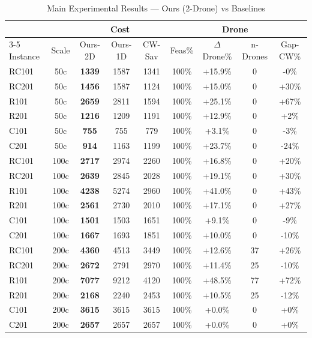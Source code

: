 \begin{table}[htbp]
\centering
\caption{Main Experimental Results — Ours (2-Drone) vs Baselines}
\label{tab:main_results}
\small
\begin{tabular}{lcccccccc}
\toprule
&& \multicolumn{3}{c}{Cost} && \multicolumn{2}{c}{Drone} & \\
\cmidrule{3-5} \cmidrule{7-8}
Instance & Scale & Ours-2D & Ours-1D & CW-Sav & Feas\% & $\Delta$Drone\% & n-Drones & Gap-CW\% \\
\midrule
  RC101 & 50c & \textbf{1339} & 1587 & 1341 & 100\% & +15.9\% & 0 & -0\% \\
  RC201 & 50c & \textbf{1456} & 1587 & 1124 & 100\% & +15.0\% & 0 & +30\% \\
  R101 & 50c & \textbf{2659} & 2811 & 1594 & 100\% & +25.1\% & 0 & +67\% \\
  R201 & 50c & \textbf{1216} & 1209 & 1191 & 100\% & +12.9\% & 0 & +2\% \\
  C101 & 50c & \textbf{755} & 755 & 779 & 100\% & +3.1\% & 0 & -3\% \\
  C201 & 50c & \textbf{914} & 1163 & 1199 & 100\% & +23.7\% & 0 & -24\% \\
  RC101 & 100c & \textbf{2717} & 2974 & 2260 & 100\% & +16.8\% & 0 & +20\% \\
  RC201 & 100c & \textbf{2639} & 2845 & 2028 & 100\% & +19.1\% & 0 & +30\% \\
  R101 & 100c & \textbf{4238} & 5274 & 2960 & 100\% & +41.0\% & 0 & +43\% \\
  R201 & 100c & \textbf{2561} & 2730 & 2010 & 100\% & +17.1\% & 0 & +27\% \\
  C101 & 100c & \textbf{1501} & 1503 & 1651 & 100\% & +9.1\% & 0 & -9\% \\
  C201 & 100c & \textbf{1667} & 1693 & 1851 & 100\% & +10.0\% & 0 & -10\% \\
  RC101 & 200c & \textbf{4360} & 4513 & 3449 & 100\% & +12.6\% & 37 & +26\% \\
  RC201 & 200c & \textbf{2672} & 2791 & 2970 & 100\% & +11.4\% & 25 & -10\% \\
  R101 & 200c & \textbf{7077} & 9212 & 4120 & 100\% & +48.5\% & 77 & +72\% \\
  R201 & 200c & \textbf{2168} & 2240 & 2453 & 100\% & +10.5\% & 25 & -12\% \\
  C101 & 200c & \textbf{3615} & 3615 & 3615 & 100\% & +0.0\% & 0 & +0\% \\
  C201 & 200c & \textbf{2657} & 2657 & 2657 & 100\% & +0.0\% & 0 & +0\% \\
\bottomrule
\end{tabular}
\end{table}